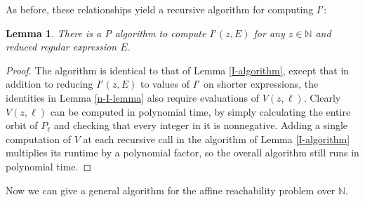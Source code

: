 \documentclass[11pt]{amsart}
\newcommand{\N}{\mathbb{N}}
\newtheorem{lemma}{Lemma}
\theoremstyle{definition}
\theoremstyle{remark}
\begin{document}
As before, these relationships yield a recursive algorithm for computing $I'$:
\begin{lemma} \label{n-I-algorithm}
There is a \textsf{P} algorithm to compute $I'(z, E)$ for any $z \in \N$ and reduced regular expression $E$.
\end{lemma}
\begin{proof}
The algorithm is identical to that of Lemma \ref{I-algorithm}, except that in addition to reducing $I'(z,E)$ to values of $I'$ on shorter expressions, the identities in Lemma \ref{n-I-lemma} also require evaluations of $V(z,\ell)$. Clearly $V(z,\ell)$ can be computed in polynomial time, by simply calculating the entire orbit of $P_\ell$ and checking that every integer in it is nonnegative. Adding a single computation of $V$ at each recursive call in the algorithm of Lemma \ref{I-algorithm} multiplies its runtime by a polynomial factor, so the overall algorithm still runs in polynomial time.
\end{proof}

Now we can give a general algorithm for the affine reachability problem over $\N$.
\end{document}
